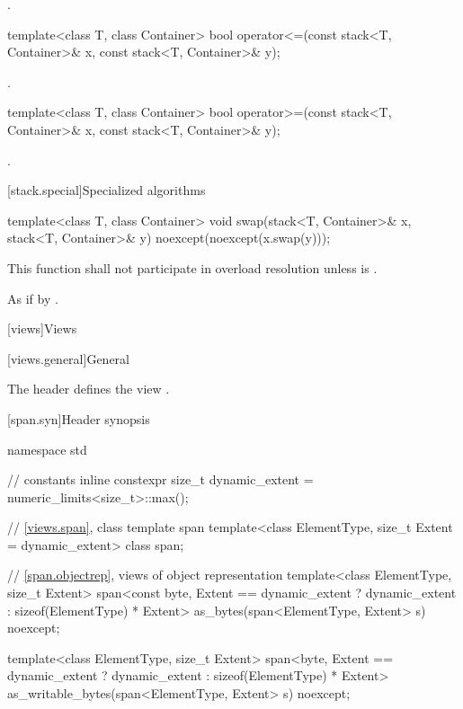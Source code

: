 \begin{itemdescr}
\pnum
\returns
{}.
\end{itemdescr}

%
\begin{itemdecl}
template<class T, class Container>
  bool operator<=(const stack<T, Container>& x, const stack<T, Container>& y);
\end{itemdecl}

\begin{itemdescr}
\pnum
\returns
{}.
\end{itemdescr}

%
\begin{itemdecl}
template<class T, class Container>
    bool operator>=(const stack<T, Container>& x, const stack<T, Container>& y);
\end{itemdecl}

\begin{itemdescr}
\pnum
\returns
{}.
\end{itemdescr}

[stack.special]{Specialized algorithms}

%
\begin{itemdecl}
template<class T, class Container>
  void swap(stack<T, Container>& x, stack<T, Container>& y) noexcept(noexcept(x.swap(y)));
\end{itemdecl}

\begin{itemdescr}
\pnum
\remarks
This function shall not participate in overload resolution
unless  is .

\pnum
\effects As if by .
\end{itemdescr}

[views]{Views}

[views.general]{General}

\pnum
The header  defines the view .

[span.syn]{Header  synopsis}%
%

\begin{codeblock}
namespace std {
  // constants
  inline constexpr size_t dynamic_extent = numeric_limits<size_t>::max();

  // \ref{views.span}, class template span
  template<class ElementType, size_t Extent = dynamic_extent>
    class span;

  // \ref{span.objectrep}, views of object representation
  template<class ElementType, size_t Extent>
    span<const byte, Extent == dynamic_extent ? dynamic_extent : sizeof(ElementType) * Extent>
      as_bytes(span<ElementType, Extent> s) noexcept;

  template<class ElementType, size_t Extent>
    span<byte, Extent == dynamic_extent ? dynamic_extent : sizeof(ElementType) * Extent>
      as_writable_bytes(span<ElementType, Extent> s) noexcept;
}
\end{codeblock}


